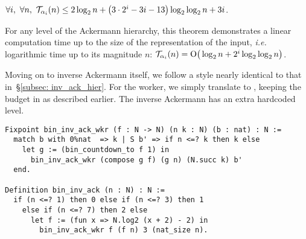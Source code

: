 \begin{thm} \label{thm: inv-ack-runtime-bin}
	$\forall i,~\forall n,~\mathcal{T}_{\alpha_i}(n) \le 2\log_2n + \left(3\cdot 2^i - 3i - 13\right)\log_2\log_2n + 3i$.
\end{thm}

\noindent For any level of the Ackermann hierarchy, this theorem demonstrates
a linear computation time up to the size of the representation of the input, \emph{i.e.} logarithmic time up to its magnitude $n$:
$\mathcal{T}_{\alpha_i}(n) = \text{O}\big(\log_2n + 2^i\log_2\log_2n \big)$.

Moving on to inverse Ackermann itself, we follow a style nearly identical to that
in~\S\ref{subsec: inv_ack_hier}. For the worker, we simply translate to
, keeping the budget in  as described earlier.
The inverse Ackermann has an extra hardcoded level.
\begin{lstlisting}
Fixpoint bin_inv_ack_wkr (f : N -> N) (n k : N) (b : nat) : N :=
  match b with 0%nat  => k | S b' => if n <=? k then k else
    let g := (bin_countdown_to f 1) in
      bin_inv_ack_wkr (compose g f) (g n) (N.succ k) b'
  end.

Definition bin_inv_ack (n : N) : N :=
  if (n <=? 1) then 0 else if (n <=? 3) then 1
    else if (n <=? 7) then 2 else
      let f := (fun x => N.log2 (x + 2) - 2) in
        bin_inv_ack_wkr f (f n) 3 (nat_size n).
\end{lstlisting}

